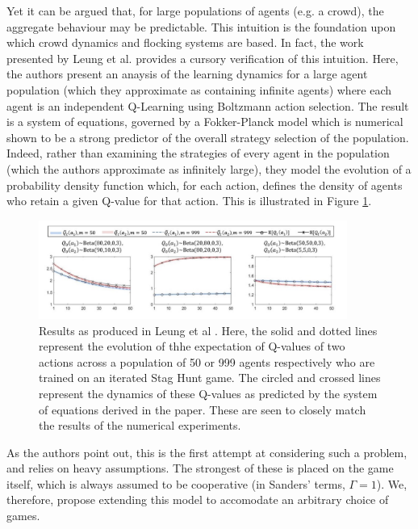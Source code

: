 \documentclass[.../main.tex]{subfiles}
\begin{document}
    Yet it can be argued that, for large populations of agents (e.g. a crowd), the aggregate
    behaviour may be predictable. This intuition is the foundation upon which crowd dynamics and
    flocking systems are based. In fact, the work presented by Leung et al. \cite{Hu2019} provides a
    cursory verification of this intuition. Here, the authors present an anaysis of the learning
    dynamics for a large agent population (which they approximate as containing infinite agents)
    where each agent is an independent Q-Learning using Boltzmann action selection. The
    result is a system of equations, governed by a Fokker-Planck model which is numerical shown to be a 
    strong predictor of the overall strategy selection of the population. Indeed, rather than
    examining the strategies of every agent in the population (which the authors approximate as
    infinitely large), they model the evolution of a probability density function which, for each
    action, defines the density of agents who retain a given Q-value for that action. This is
    illustrated in Figure \ref{fig::LeungPredictions}.

    \begin{figure}[h]
    	\centering
    	\includegraphics[width=0.9\textwidth]{Figures/LeungPredictions}
    	\caption{ \label{fig::LeungPredictions} Results as produced in Leung et al \cite{Hu2019}.
    	Here, the solid and dotted lines represent the evolution of thhe expectation of Q-values of
    	two actions across a population of 50 or 999 agents respectively who are trained on an
    	iterated Stag Hunt game. The circled and crossed
    	lines represent the dynamics of these Q-values as predicted by the system of equations
    	derived in the paper. These are seen to closely match the results of the numerical
    	experiments.}
    \end{figure}

   	As the authors point out, this is the first attempt at considering such a problem, and relies on
	heavy assumptions. The strongest of these is placed on the game itself, which is always
	assumed to be cooperative (in Sanders' terms, $\Gamma = 1$). We, therefore, propose extending
	this model to accomodate an arbitrary choice of games. 
\end{document}
